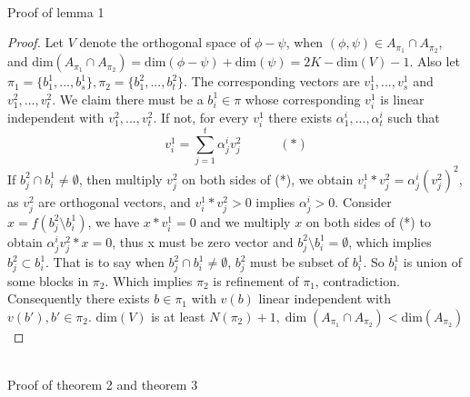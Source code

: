 \documentclass[11pt]{amsart}
\begin{document}
\section{}
\hfill\\
Proof of lemma 1
\begin{proof}
Let $V$ denote the orthogonal space of $\phi - \psi$, when $(\phi,\psi)\in A_{\pi_1} \cap A_{\pi_2}$, and $\text{dim}(A_{\pi_1} \cap A_{\pi_2}) = \text{dim}(\phi - \psi) + \text{dim}(\psi) = 2K - \text{dim}(V) - 1$. Also let $\pi_1 = \{b_1^1,...,b_s^1\}, \pi_2 = \{b_1^2,...,b_t^2\}$. The corresponding vectors are $v_1^1,...,v_s^1$ and $v_1^2,...,v_t^2$. We claim there must be a $b_i^1\in \pi$ whose corresponding $v_i^1$ is linear independent with $v_1^2,...,v_t^2$. If not, for every $v_i^1$ there exists $\alpha_1^i,...,\alpha_t^i$ such that 
\[
v_i^1 = \sum_{j = 1}^t \alpha_j^i v_j^2 \quad\quad\quad(*)
\]
If $b_j^2 \cap b_i^1 \neq \emptyset$, then multiply $v_j^2$ on both sides of (*), we obtain $v_i^1 * v_j^2 = \alpha_j^i (v_j^2)^2$, as $v_j^2$ are orthogonal vectors, and $v_i^1 * v_j^2 > 0$ implies $\alpha_j^i > 0$. Consider $x = f(b_j^2\setminus b_i^1)$, we have $x*v_i^1 = 0$ and we multiply $x$ on both sides of (*) to obtain $\alpha_j^i v_j^2*x = 0$, thus x must be zero vector and $b_j^2\setminus b_i^1= \emptyset$, which implies $b_j^2 \subset b_i^1$. That is to say when $b_j^2 \cap b_i^1 \neq \emptyset$, $b_j^2$ must be subset of $b_i^1$. So $b_i^1$ is union of some blocks in $\pi_2$. Which implies $\pi_2$ is refinement of $\pi_1$, contradiction.\\
Consequently there exists $b\in\pi_1$ with $v(b)$ linear independent with $v(b'), b'\in\pi_2$. $\text{dim}(V)$ is at least $N(\pi_2) + 1, \dim(A_{\pi_1} \cap A_{\pi_2}) < \text{dim}(A_{\pi_2})$
\end{proof}
\hfill\\
Proof of theorem 2 and theorem 3
\end{document}
